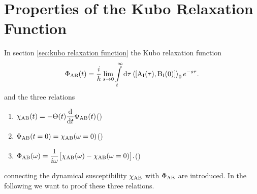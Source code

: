 %
%
\chapter{Properties of the Kubo Relaxation Function}
\label{app:properties of the Kubo relaxation function}
%
%
In section \ref{sec:kubo relaxation function} the Kubo relaxation function 
%
\begin{align}
	\Phi_{\mt{AB}}(t) = \frac{i}{\hbar} \lim\limits_{s \to 0} \int\limits_{t}^{\infty} \dd{\tau} \expval{\comm{\mt{A}_{\mt{I}}(\tau)}{\mt{B}_{\mt{I}}(0)}}_{0} e^{-s\tau}.
	\label{appeq:Kubo relaxation function}
\end{align}
%
and the three relations 
%
\begin{enumerate}
	\item $\begin{aligned}[t] \chi_{\mathrm{AB}}(t) = -\Theta(t) \dv{t} \Phi_{\mathrm{AB}}(t) \end{aligned}$\hfill {}(\theequation)\label{appeq:relation 1 between Phi and chi}
	\item $\begin{aligned}[t] \Phi_{\mathrm{AB}}(t = 0) = \chi_{\mathrm{AB}}(\omega = 0) \end{aligned}$\hfill {}(\theequation)\label{appeq:relation 2 between Phi and chi}
	\item $\begin{aligned}[t] \Phi_{\mathrm{AB}}(\omega) = \frac{1}{i\omega}\big[\chi_{\mathrm{AB}}(\omega) - \chi_{\mathrm{AB}}(\omega = 0)\big]. \end{aligned}$\hfill {}(\theequation)\label{appeq:relation 3 between Phi and chi}
\end{enumerate}
%
connecting the dynamical susceptibility $\chi_{\mathrm{AB}}$ with $\Phi_{\mathrm{AB}}$ are introduced.
In the following we want to proof these three relations.

